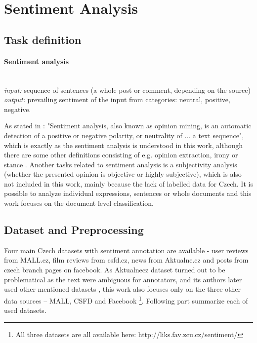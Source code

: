 \section{Sentiment Analysis}
\label{chap:sent}
\subsection{Task definition}
\paragraph{Sentiment analysis} \mbox{}\\
\textit{input:} sequence of sentences (a whole post or comment, depending on the source) \\
\textit{output:} prevailing sentiment of the input from categories: neutral, positive, negative.


As stated in \citep{Veselovska}: "Sentiment analysis, also known as opinion mining, is an automatic detection of a positive or negative polarity, or neutrality of ... a text sequence", which is exactly as the sentiment analysis is understood in this work, although there are some other definitions consisting of e.g. opinion extraction, irony or stance \citep{Montoyo2012}. Another tasks related to sentiment analysis is a subjectivity analysis (whether the presented opinion is objective or highly subjective), which is also not included in this work, mainly because the lack of labelled data for Czech. It is possible to analyze individual expressions, sentences or whole documents \citep{Veselovska} and this work focuses on the document level classification.
\subsection{Dataset and Preprocessing}
Four main Czech datasets with sentiment annotation are available - user reviews from MALL.cz, film reviews from csfd.cz, news from Aktualne.cz and posts from czech branch pages on facebook. As Aktualnecz dataset turned out to be problematical as the text were ambiguous for annotators, and its authors later used other mentioned datasets \citep{Veselovska}, this work also focuses only on the three other data sources -- MALL, CSFD and Facebook \footnote{All three datasets are all available here: http://liks.fav.zcu.cz/sentiment/}. Following part summarize each of used datasets.
